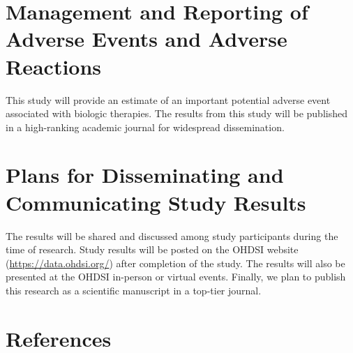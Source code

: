 \documentclass[
  12pt,
]{article}
\begin{document}
\hypertarget{management-and-reporting-of-adverse-events-and-adverse-reactions}{%
\section{Management and Reporting of Adverse Events and Adverse Reactions}\label{management-and-reporting-of-adverse-events-and-adverse-reactions}}

This study will provide an estimate of an important potential adverse event associated with biologic therapies. The results from this study will be published in a high-ranking academic journal for widespread dissemination.

\hypertarget{plans-for-disseminating-and-communicating-study-results}{%
\section{Plans for Disseminating and Communicating Study Results}\label{plans-for-disseminating-and-communicating-study-results}}

The results will be shared and discussed among study participants during the time of research. Study results will be posted on the OHDSI website (\url{https://data.ohdsi.org/}) after completion of the study. The results will also be presented at the OHDSI in-person or virtual events. Finally, we plan to publish this research as a scientific manuscript in a top-tier journal.

\clearpage

\hypertarget{references}{%
\section*{References}\label{references}}
\end{document}
